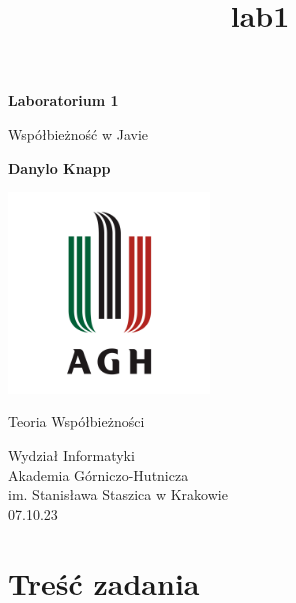 \documentclass[11pt]{article}
\title{lab1}
\begin{document}
    

    \begin{titlepage}
        \begin{center}
            \vspace*{1cm}
     
            \textbf{Laboratorium 1}
     
            \vspace{0.5cm}
            Współbieżność w Javie
                 
            \vspace{1.5cm}
     
            \textbf{Danylo Knapp}
    
            \vfill
    
            \includegraphics[width=0.4\textwidth]{agh-logo.png}
     
            \vfill
                 
            Teoria Współbieżności
                 
            \vspace{0.8cm}
    
            Wydział Informatyki\\
            Akademia Górniczo-Hutnicza\\
            im. Stanisława Staszica w Krakowie\\
            07.10.23
                 
        \end{center}
    \end{titlepage}
    
    

    
    \hypertarget{treux15bux107-zadania}{%
\section{Treść zadania}\label{treux15bux107-zadania}}
\end{document}
